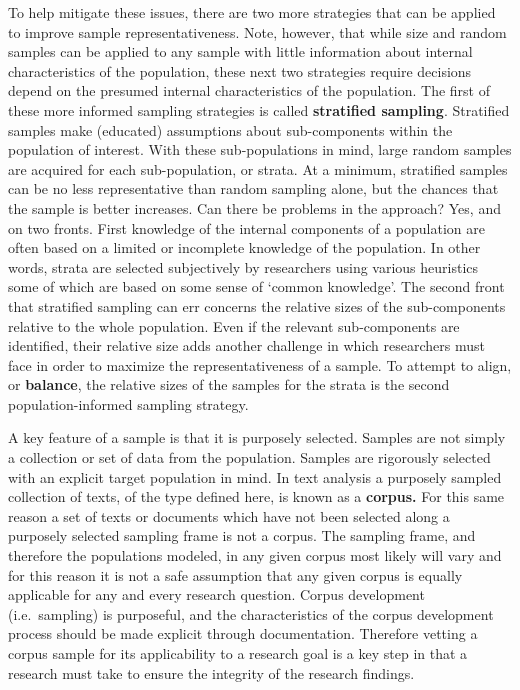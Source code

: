 \documentclass[
]{article}
\begin{document}
To help mitigate these issues, there are two more strategies that can be applied to improve sample representativeness. Note, however, that while size and random samples can be applied to any sample with little information about internal characteristics of the population, these next two strategies require decisions depend on the presumed internal characteristics of the population. The first of these more informed sampling strategies is called \textbf{stratified sampling}. Stratified samples make (educated) assumptions about sub-components within the population of interest. With these sub-populations in mind, large random samples are acquired for each sub-population, or strata. At a minimum, stratified samples can be no less representative than random sampling alone, but the chances that the sample is better increases. Can there be problems in the approach? Yes, and on two fronts. First knowledge of the internal components of a population are often based on a limited or incomplete knowledge of the population. In other words, strata are selected subjectively by researchers using various heuristics some of which are based on some sense of `common knowledge'. The second front that stratified sampling can err concerns the relative sizes of the sub-components relative to the whole population. Even if the relevant sub-components are identified, their relative size adds another challenge in which researchers must face in order to maximize the representativeness of a sample. To attempt to align, or \textbf{balance}, the relative sizes of the samples for the strata is the second population-informed sampling strategy.

A key feature of a sample is that it is purposely selected. Samples are not simply a collection or set of data from the population. Samples are rigorously selected with an explicit target population in mind. In text analysis a purposely sampled collection of texts, of the type defined here, is known as a \textbf{corpus.} For this same reason a set of texts or documents which have not been selected along a purposely selected sampling frame is not a corpus. The sampling frame, and therefore the populations modeled, in any given corpus most likely will vary and for this reason it is not a safe assumption that any given corpus is equally applicable for any and every research question. Corpus development (i.e.~sampling) is purposeful, and the characteristics of the corpus development process should be made explicit through documentation. Therefore vetting a corpus sample for its applicability to a research goal is a key step in that a research must take to ensure the integrity of the research findings.
\end{document}
